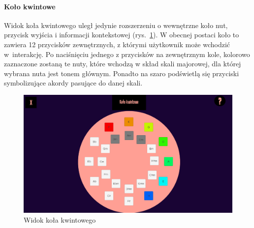 
\paragraph{Koło kwintowe}
Widok koła kwintowego uległ jedynie rozszerzeniu o wewnętrzne koło nut, przycisk wyjścia i informacji kontekstowej (rys.~\ref{fig:Kolo}).
W obecnej postaci koło to zawiera 12 przycisków zewnętrznych, z którymi użytkownik może wchodzić w~interakcję. Po naciśnięciu jednego z przycisków na zewnętrznym kole, kolorowo zaznaczone zostaną te nuty, które wchodzą w skład skali majorowej, dla której wybrana nuta jest tonem głównym. Ponadto na szaro podświetlą się przyciski symbolizujące akordy pasujące do danej skali.
\begin{figure}[htb]
	\centering
	\includegraphics[width=.7\linewidth]{rysB/KoloK}
	\caption{Widok koła kwintowego} \label{fig:Kolo}
\end{figure}

